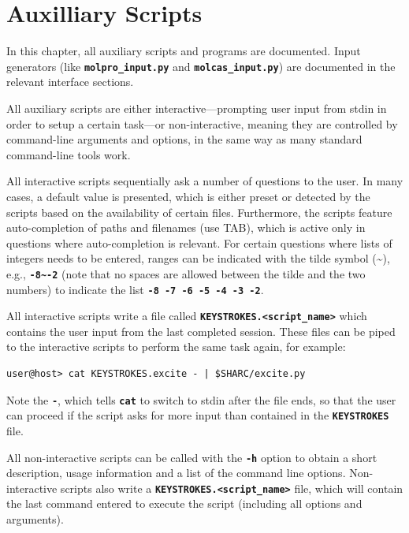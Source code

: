 \documentclass[a4paper,10pt,DIV=15,openany]{scrbook}
\newcommand{\ttt}[1]{\textbf{\texttt{#1}}}
\begin{document}

\chapter{Auxilliary Scripts}\label{chap:aux}

In this chapter, all auxiliary scripts and programs are documented. Input generators (like \ttt{molpro\_input.py} and \ttt{molcas\_input.py}) are documented in the relevant interface sections.

All auxiliary scripts are either interactive---prompting user input from stdin in order to setup a certain task---or non-interactive, meaning they are controlled by command-line arguments and options, in the same way as many standard command-line tools work.

All interactive scripts sequentially ask a number of questions to the user. In many cases, a default value is presented, which is either preset or detected by the scripts based on the availability of certain files. Furthermore, the scripts feature auto-completion of paths and filenames (use TAB), which is active only in questions where auto-completion is relevant. For certain questions where lists of integers needs to be entered, ranges can be indicated with the tilde symbol (\textasciitilde), e.g., \ttt{-8\textasciitilde-2} (note that no spaces are allowed between the tilde and the two numbers) to indicate the list \ttt{-8 -7 -6 -5 -4 -3 -2}. 

All interactive scripts write a file called \ttt{KEYSTROKES.<script\_name>} which contains the user input from the last completed session. These files can be piped to the interactive scripts to perform the same task again, for example:
\begin{verbatim}
user@host> cat KEYSTROKES.excite - | $SHARC/excite.py
\end{verbatim}
Note the \ttt{-}, which tells \ttt{cat} to switch to stdin after the file ends, so that the user can proceed if the script asks for more input than contained in the \ttt{KEYSTROKES} file.

All non-interactive scripts can be called with the \ttt{-h} option to obtain a short description, usage information and a list of the command line options.
Non-interactive scripts also write a \ttt{KEYSTROKES.<script\_name>} file, which will contain the last command entered to execute the script (including all options and arguments).
\end{document}
